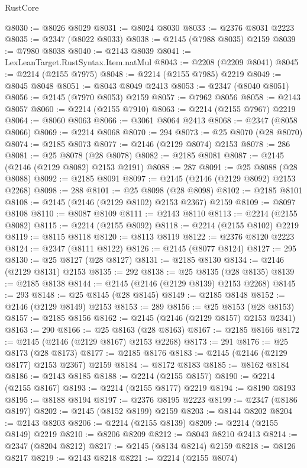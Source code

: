 \begin{lexlean}{RustCore}
\begin{coremodule}
@8030 := @8026 @8029
@8031 := @8024 @8030
@8033 := @2376 @8031 @2223
@8035 := @2347 (@8022 @8033)
@8038 := @2145 (@7988 @8035) @2159
@8039 := @7980 @8038
@8040 := @2143 @8039
@8041 := LexLeanTarget.RustSyntax.Item.natMul
@8043 := @2208 (@2209 @8041)
@8045 := @2214 (@2155 @7975)
@8048 := @2214 (@2155 @7985) @2219
@8049 := @8045 @8048
@8051 := @8043 @8049 @2413
@8053 := @2347 (@8040 @8051)
@8056 := @2145 (@7970 @8053) @2159
@8057 := @7962 @8056
@8058 := @2143 @8057
@8060 := @2214 (@2155 @7910)
@8063 := @2214 (@2155 @7967) @2219
@8064 := @8060 @8063
@8066 := @3061 @8064 @2413
@8068 := @2347 (@8058 @8066)
@8069 := @2214 @8068
@8070 := 294
@8073 := @25 @8070 (@28 @8070)
@8074 := @2185 @8073
@8077 := @2146 (@2129 @8074) @2153
@8078 := 286
@8081 := @25 @8078 (@28 @8078)
@8082 := @2185 @8081
@8087 := @2145 (@2146 (@2129 @8082) @2153 @2191)
@8088 := 287
@8091 := @25 @8088 (@28 @8088)
@8092 := @2185 @8091
@8097 := @2145 (@2146 (@2129 @8092) @2153 @2268)
@8098 := 288
@8101 := @25 @8098 (@28 @8098)
@8102 := @2185 @8101
@8108 := @2145 (@2146 (@2129 @8102) @2153 @2367) @2159
@8109 := @8097 @8108
@8110 := @8087 @8109
@8111 := @2143 @8110
@8113 := @2214 (@2155 @8082)
@8115 := @2214 (@2155 @8092)
@8118 := @2214 (@2155 @8102) @2219
@8119 := @8115 @8118
@8120 := @8113 @8119
@8122 := @2376 @8120 @2223
@8124 := @2347 (@8111 @8122)
@8126 := @2145 (@8077 @8124)
@8127 := 295
@8130 := @25 @8127 (@28 @8127)
@8131 := @2185 @8130
@8134 := @2146 (@2129 @8131) @2153
@8135 := 292
@8138 := @25 @8135 (@28 @8135)
@8139 := @2185 @8138
@8144 := @2145 (@2146 (@2129 @8139) @2153 @2268)
@8145 := 293
@8148 := @25 @8145 (@28 @8145)
@8149 := @2185 @8148
@8152 := @2146 (@2129 @8149) @2153
@8153 := 289
@8156 := @25 @8153 (@28 @8153)
@8157 := @2185 @8156
@8162 := @2145 (@2146 (@2129 @8157) @2153 @2341)
@8163 := 290
@8166 := @25 @8163 (@28 @8163)
@8167 := @2185 @8166
@8172 := @2145 (@2146 (@2129 @8167) @2153 @2268)
@8173 := 291
@8176 := @25 @8173 (@28 @8173)
@8177 := @2185 @8176
@8183 := @2145 (@2146 (@2129 @8177) @2153 @2367) @2159
@8184 := @8172 @8183
@8185 := @8162 @8184
@8186 := @2143 @8185
@8188 := @2214 (@2155 @8157)
@8190 := @2214 (@2155 @8167)
@8193 := @2214 (@2155 @8177) @2219
@8194 := @8190 @8193
@8195 := @8188 @8194
@8197 := @2376 @8195 @2223
@8199 := @2347 (@8186 @8197)
@8202 := @2145 (@8152 @8199) @2159
@8203 := @8144 @8202
@8204 := @2143 @8203
@8206 := @2214 (@2155 @8139)
@8209 := @2214 (@2155 @8149) @2219
@8210 := @8206 @8209
@8212 := @8043 @8210 @2413
@8214 := @2347 (@8204 @8212)
@8217 := @2145 (@8134 @8214) @2159
@8218 := @8126 @8217
@8219 := @2143 @8218
@8221 := @2214 (@2155 @8074)

\end{coremodule}
\end{lexlean}
